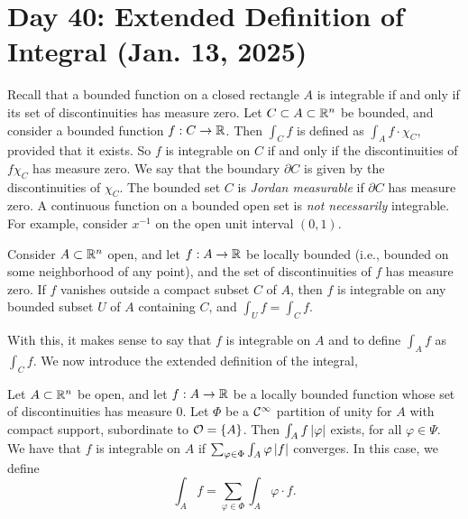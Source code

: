 \section{Day 40: Extended Definition of Integral (Jan. 13, 2025)}
Recall that a bounded function on a closed rectangle $A$ is integrable if and only if its set of discontinuities has measure zero. Let $C \subset A \subset \mathbb R^n$ be bounded, and consider a bounded function $f : C \to \mathbb R$. Then $\int_C f$ is defined as $\int_A f \cdot \chi_C$, provided that it exists. So $f$ is integrable on $C$ if and only if the discontinuities of $f \chi_C$ has measure zero. We say that the boundary $\partial C$ is given by the discontinuities of $\chi_C$. The bounded set $C$ is \textit{Jordan measurable} if $\partial C$ has measure zero.
\medskip\newline
A continuous function on a bounded open set is \textit{not necessarily} integrable. For example, consider $x^{-1}$ on the open unit interval $(0, 1)$.
\begin{remark}
    Consider $A \subset \mathbb R^n$ open, and let $f : A \to \mathbb R$ be locally bounded (i.e., bounded on some neighborhood of any point), and the set of discontinuities of $f$ has measure zero. If $f$ vanishes outside a compact subset $C$ of $A$, then $f$ is integrable on any bounded subset $U$ of $A$ containing $C$, and $\int_U f = \int_C f$.
\end{remark}
\noindent With this, it makes sense to say that $f$ is integrable on $A$ and to define $\int_A f$ as $\int_C f$. We now introduce the extended definition of the integral,
\begin{definition}
    Let $A \subset \mathbb R^n$ be open, and let $f : A \to \mathbb R$ be a locally bounded function whose set of discontinuities has measure $0$. Let $\Phi$ be a $\mathcal C^\infty$ partition of unity for $A$ with compact support, subordinate to $\mathcal O = \{A\}$. Then $\int_A f \left\lvert \varphi \right\rvert$ exists, for all $\varphi \in \Psi$. We have that $f$ is integrable on $A$ if $\sum_{\varphi \in \Phi} \int_A \varphi \left\lvert f \right\rvert$ converges. In this case, we define
    \[ \int_A f = \sum_{\varphi \in \Phi} \int_A \varphi \cdot f. \]
\end{definition}
